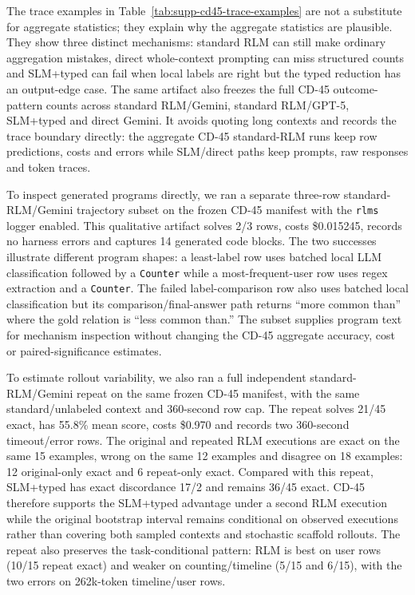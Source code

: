 The trace examples in Table~\ref{tab:supp-cd45-trace-examples} are not a substitute for aggregate statistics; they explain why the aggregate statistics are plausible. They show three distinct mechanisms: standard RLM can still make ordinary aggregation mistakes, direct whole-context prompting can miss structured counts and SLM+typed can fail when local labels are right but the typed reduction has an output-edge case. The same artifact also freezes the full CD-45 outcome-pattern counts across standard RLM/Gemini, standard RLM/GPT-5, SLM+typed and direct Gemini. It avoids quoting long contexts and records the trace boundary directly: the aggregate CD-45 standard-RLM runs keep row predictions, costs and errors while SLM/direct paths keep prompts, raw responses and token traces.

To inspect generated programs directly, we ran a separate three-row standard-RLM/Gemini trajectory subset on the frozen CD-45 manifest with the \texttt{rlms} logger enabled. This qualitative artifact solves 2/3 rows, costs \$0.015245, records no harness errors and captures 14 generated code blocks. The two successes illustrate different program shapes: a least-label row uses batched local LLM classification followed by a \texttt{Counter} while a most-frequent-user row uses regex extraction and a \texttt{Counter}. The failed label-comparison row also uses batched local classification but its comparison/final-answer path returns ``more common than'' where the gold relation is ``less common than.'' The subset supplies program text for mechanism inspection without changing the CD-45 aggregate accuracy, cost or paired-significance estimates.

To estimate rollout variability, we also ran a full independent standard-RLM/Gemini repeat on the same frozen CD-45 manifest, with the same standard/unlabeled context and 360-second row cap. The repeat solves 21/45 exact, has 55.8\% mean score, costs \$0.970 and records two 360-second timeout/error rows. The original and repeated RLM executions are exact on the same 15 examples, wrong on the same 12 examples and disagree on 18 examples: 12 original-only exact and 6 repeat-only exact. Compared with this repeat, SLM+typed has exact discordance 17/2 and remains 36/45 exact. CD-45 therefore supports the SLM+typed advantage under a second RLM execution while the original bootstrap interval remains conditional on observed executions rather than covering both sampled contexts and stochastic scaffold rollouts. The repeat also preserves the task-conditional pattern: RLM is best on user rows (10/15 repeat exact) and weaker on counting/timeline (5/15 and 6/15), with the two errors on 262k-token timeline/user rows.

